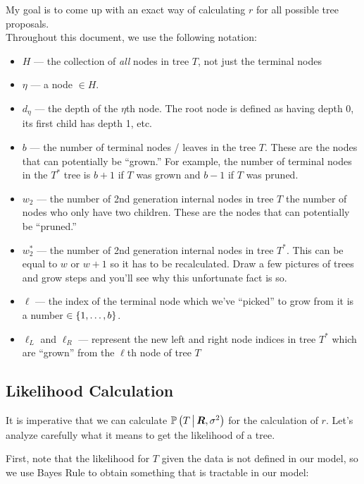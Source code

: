 My goal is to come up with an exact way of calculating $r$ for all possible tree proposals.\\

Throughout this document, we use the following notation:

\begin{itemize}
\item $H$ ---  the collection of \textit{all} nodes in tree $T$, not just the terminal nodes
\item $\eta$ --- a node $\in H$.
\item $d_\eta$ --- the depth of the $\eta$th node. The root node is defined as having depth 0, its first child has depth 1, etc.
\item $b$ --- the number of terminal nodes / leaves in the tree $T$. These are the nodes that can potentially be ``grown.'' For example, the number of terminal nodes in the $T^*$ tree is $b+1$ if $T$ was grown and $b-1$ if $T$ was pruned.
\item $w_2$ --- the number of 2nd generation internal nodes in tree $T$ \ie the number of nodes who only have two children. These are the nodes that can potentially be ``pruned.''
\item $w_2^*$ --- the number of 2nd generation internal nodes in tree $T^*$. This can be equal to $w$ or $w+1$ so it has to be recalculated. Draw a few pictures of trees and grow steps and you'll see why this unfortunate fact is so.
\item  $\ell$ --- the index of the terminal node which we've ``picked'' to grow from it is a number $\in \left\{1, \ldots, b\right\}$.
\item $\ell_L$ and $\ell_R$ --- represent the new left and right node indices in tree $T^*$ which are ``grown'' from the $\ell$th node of tree $T$
\end{itemize}

\subsection*{Likelihood Calculation}

It is imperative that we can calculate $\mathbb{P}\left(T \, \big| \, \boldsymbol{R}, \sigma^2\right)$ for the calculation of $r$. Let's analyze carefully what it means to get the likelihood of a tree.

First, note that the likelihood for $T$ given the data is not defined in our model, so we use Bayes Rule to obtain something that is tractable in our model:

